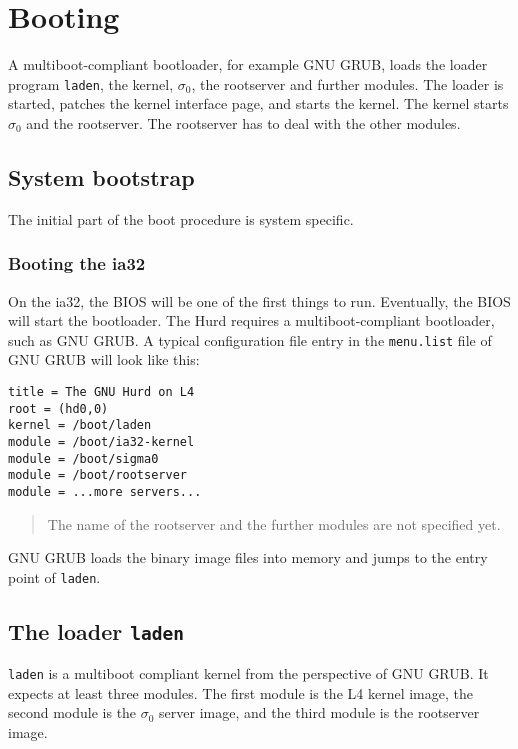 \documentclass[9pt,a4paper]{extarticle}
\newenvironment{comment}{\footnotesize \begin{quote}}{\end{quote}}
\begin{document}
\section{Booting}

A multiboot-compliant bootloader, for example GNU GRUB, loads the
loader program \texttt{laden}, the kernel, $\sigma_0$, the rootserver
and further modules.  The loader is started, patches the kernel
interface page, and starts the kernel.  The kernel starts $\sigma_0$
and the rootserver.  The rootserver has to deal with the other
modules.


\subsection{System bootstrap}

The initial part of the boot procedure is system specific.


\subsubsection{Booting the ia32}

On the ia32, the BIOS will be one of the first things to run.
Eventually, the BIOS will start the bootloader.  The Hurd requires a
multiboot-compliant bootloader, such as GNU GRUB.  A typical
configuration file entry in the \verb/menu.list/ file of GNU GRUB will
look like this:

\begin{verbatim}
title = The GNU Hurd on L4
root = (hd0,0)
kernel = /boot/laden
module = /boot/ia32-kernel
module = /boot/sigma0
module = /boot/rootserver
module = ...more servers...
\end{verbatim}

\begin{comment}
  The name of the rootserver and the further modules are not specified
  yet.
\end{comment}

GNU GRUB loads the binary image files into memory and jumps to the
entry point of \texttt{laden}.


\subsection{The loader \texttt{laden}}

\texttt{laden} is a multiboot compliant kernel from the perspective of
GNU GRUB.  It expects at least three modules.  The first module is the
L4 kernel image, the second module is the $\sigma_0$ server image, and
the third module is the rootserver image.
\end{document}
